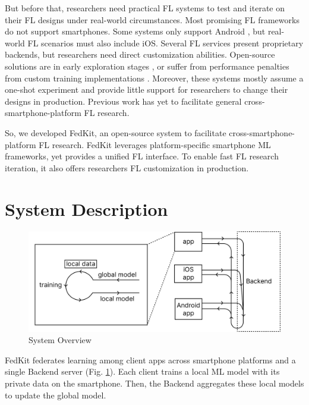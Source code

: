 \documentclass[letterpaper]{article} %
\begin{document}
But before that, researchers need practical FL systems to test and
iterate on their FL designs under real-world circumstances.
Most promising FL frameworks
\cite[e.g.,][]{bonawitz2019towards,liu2021fate,ma2019paddlepaddle,openfl_citation}
do not support smartphones.
Some systems only support Android
\cite{he2020fedml,madrigal2023project},
but real-world FL scenarios must also include iOS.
Several FL services present proprietary backends,
but researchers need direct customization abilities.
Open-source solutions are in early exploration stages
\cite{beutel2020flower,mathur2021ondevice},
or suffer from performance penalties from custom training implementations
\cite{ryffel2018generic,Ziller2021,hall2021syft}.
Moreover, these systems mostly assume a one-shot experiment and
provide little support for researchers to change their designs in production.
Previous work has yet to facilitate general cross-smartphone-platform
FL research.

So, we developed FedKit,
an open-source system to facilitate
cross-smartphone-platform FL research.
FedKit leverages platform-specific smartphone ML frameworks,
yet provides a unified FL interface.
To enable fast FL research iteration,
it also offers researchers FL customization in production.

\section{System Description}

\begin{figure}
    \centering
    \includegraphics*[width=\linewidth]{system_overview.pdf}
    \caption{System Overview}
    \label{system_overview}
\end{figure}

FedKit federates learning among client apps across smartphone platforms and
a single Backend server (Fig. \ref{system_overview}).
Each client trains a local ML model with its private data on the smartphone.
Then, the Backend aggregates these local models to update the global model.
\end{document}
